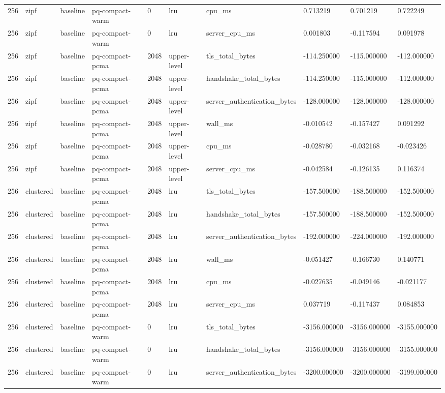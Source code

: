 \begin{tabular}{llllllllll}
256 & zipf & baseline & pq-compact-warm & 0 & lru & cpu\_ms & 0.713219 & 0.701219 & 0.722249 \\
256 & zipf & baseline & pq-compact-warm & 0 & lru & server\_cpu\_ms & 0.001803 & -0.117594 & 0.091978 \\
256 & zipf & baseline & pq-compact-pcma & 2048 & upper-level & tls\_total\_bytes & -114.250000 & -115.000000 & -112.000000 \\
256 & zipf & baseline & pq-compact-pcma & 2048 & upper-level & handshake\_total\_bytes & -114.250000 & -115.000000 & -112.000000 \\
256 & zipf & baseline & pq-compact-pcma & 2048 & upper-level & server\_authentication\_bytes & -128.000000 & -128.000000 & -128.000000 \\
256 & zipf & baseline & pq-compact-pcma & 2048 & upper-level & wall\_ms & -0.010542 & -0.157427 & 0.091292 \\
256 & zipf & baseline & pq-compact-pcma & 2048 & upper-level & cpu\_ms & -0.028780 & -0.032168 & -0.023426 \\
256 & zipf & baseline & pq-compact-pcma & 2048 & upper-level & server\_cpu\_ms & -0.042584 & -0.126135 & 0.116374 \\
256 & clustered & baseline & pq-compact-pcma & 2048 & lru & tls\_total\_bytes & -157.500000 & -188.500000 & -152.500000 \\
256 & clustered & baseline & pq-compact-pcma & 2048 & lru & handshake\_total\_bytes & -157.500000 & -188.500000 & -152.500000 \\
256 & clustered & baseline & pq-compact-pcma & 2048 & lru & server\_authentication\_bytes & -192.000000 & -224.000000 & -192.000000 \\
256 & clustered & baseline & pq-compact-pcma & 2048 & lru & wall\_ms & -0.051427 & -0.166730 & 0.140771 \\
256 & clustered & baseline & pq-compact-pcma & 2048 & lru & cpu\_ms & -0.027635 & -0.049146 & -0.021177 \\
256 & clustered & baseline & pq-compact-pcma & 2048 & lru & server\_cpu\_ms & 0.037719 & -0.117437 & 0.084853 \\
256 & clustered & baseline & pq-compact-warm & 0 & lru & tls\_total\_bytes & -3156.000000 & -3156.000000 & -3155.000000 \\
256 & clustered & baseline & pq-compact-warm & 0 & lru & handshake\_total\_bytes & -3156.000000 & -3156.000000 & -3155.000000 \\
256 & clustered & baseline & pq-compact-warm & 0 & lru & server\_authentication\_bytes & -3200.000000 & -3200.000000 & -3199.000000 \\

\end{tabular}
